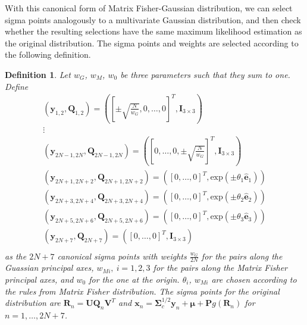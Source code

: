 \documentclass[12pt]{article}
\newtheorem{definition}{Definition}
\begin{document}
With this canonical form of Matrix Fisher-Gaussian distribution, we can select sigma points analogously to a multivariate Gaussian distribution, and then check whether the resulting selections have the same maximum likelihood estimation as the original distribution.
The sigma points and weights are selected according to the following definition.
\begin{definition}
	Let $w_G$, $w_M$, $w_0$ be three parameters such that they sum to one.
	Define
	\begin{equation}
		\begin{matrix}
			(\bm{y}_{1,2},\mathbf{Q}_{1,2}) = \left(\left[\pm\sqrt{\frac{N}{w_G}},0,\ldots,0\right]^T,\mathbf{I}_{3\times 3}\right) \\
			\vdots \\
			(\bm{y}_{2N-1,2N},\mathbf{Q}_{2N-1,2N}) = \left(\left[0,\ldots,0,\pm\sqrt{\frac{N}{w_G}}\right]^T,\mathbf{I}_{3\times 3}\right) \\
			(\bm{y}_{2N+1,2N+2},\mathbf{Q}_{2N+1,2N+2}) = \left(\left[0,\ldots,0\right]^T,\mathrm{exp}(\pm\theta_1\hat{\bm{e}}_1)\right) \\
			(\bm{y}_{2N+3,2N+4},\mathbf{Q}_{2N+3,2N+4}) = \left(\left[0,\ldots,0\right]^T,\mathrm{exp}(\pm\theta_2\hat{\bm{e}}_2)\right) \\
			(\bm{y}_{2N+5,2N+6},\mathbf{Q}_{2N+5,2N+6}) = \left(\left[0,\ldots,0\right]^T,\mathrm{exp}(\pm\theta_3\hat{\bm{e}}_3)\right) \\
			(\bm{y}_{2N+7},\mathbf{Q}_{2N+7}) = \left(\left[0,\ldots,0\right]^T,\mathbf{I}_{3\times 3}\right) \\
		\end{matrix}
	\end{equation}
	as the $2N+7$ canonical sigma points with weights $\frac{w_G}{2N}$ for the pairs along the Guassian principal axes, $w_{Mi},\ i=1,2,3$ for the pairs along the Matrix Fisher principal axes, and $w_0$ for the one at the origin.
	$\theta_i$, $w_{Mi}$ are chosen according to the rules from Matrix Fisher distribution.
	The sigma points for the original distribution are $\mathbf{R}_n = \mathbf{U}\mathbf{Q}_n\mathbf{V}^T$ and $\bm{x}_n = \mathbf{\Sigma}_c^{1/2}\bm{y}_n+\bm{\mu}+\mathbf{P}g(\mathbf{R}_n)$ for $n=1,\ldots,2N+7$.
\end{definition}
\end{document}
